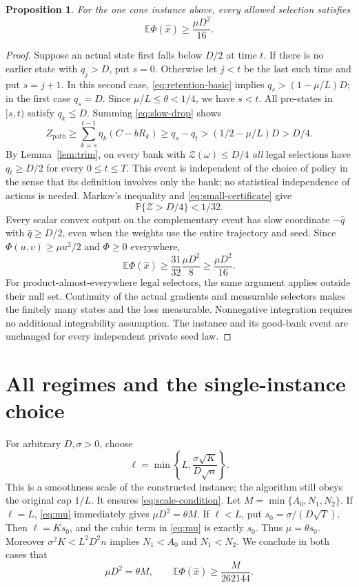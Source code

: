 \documentclass[11pt]{article}
\newtheorem{proposition}[theorem]{Proposition}
\theoremstyle{remark}
\newcommand{\E}{\mathbb E}
\newcommand{\Prob}{\mathbb P}
\begin{document}
\begin{proposition}\label{prop:cone-risk}
For the one cone instance above, every allowed selection satisfies
\begin{equation}\label{eq:cone-risk}
 \E\Phi(\widehat x)\ge\frac{\mu D^2}{16}.
\end{equation}
\end{proposition}
\begin{proof}
Suppose an actual state first falls below $D/2$ at time $t$. If there
is no earlier state with $q_j>D$, put $s=0$. Otherwise let $j<t$ be
the last such time and put $s=j+1$. In this second case,
\eqref{eq:retention-basic} implies
$q_s>(1-\mu/L)D$; in the first case $q_s=D$. Since
$\mu/L\le\theta<1/4$, we have $s<t$. All pre-states in $[s,t)$
satisfy $q_k\le D$. Summing \eqref{eq:slow-drop} shows
\[
 Z_{\mathrm{path}}\ge\sum_{k=s}^{t-1}\eta_k(C-bR_k)
          \ge q_s-q_t>(1/2-\mu/L)D>D/4.
\]
By Lemma~\ref{lem:trim}, on every bank with
$\mathcal Z(\omega)\le D/4$ \emph{all} legal selections have
$q_t\ge D/2$ for every $0\le t\le T$. This event is independent
of the choice of policy in the sense that its definition involves
only the bank; no statistical independence of actions is needed.
Markov's inequality and \eqref{eq:small-certificate} give
\[
 \Prob\{\mathcal Z>D/4\}<1/32.
\]
Every scalar convex output on the complementary event has slow
coordinate $-\widehat q$ with $\widehat q\ge D/2$, even when the
weights use the entire trajectory and seed. Since
$\Phi(u,v)\ge\mu u^2/2$ and $\Phi\ge0$ everywhere,
\[
 \E\Phi(\widehat x)\ge\frac{31}{32}\frac{\mu D^2}{8}
                         \ge\frac{\mu D^2}{16}.
\]
For product-almost-everywhere legal selectors, the same argument
applies outside their null set. Continuity of the actual gradients
and measurable selectors makes the finitely many states and the loss
measurable. Nonnegative integration requires no additional
integrability assumption. The instance and its good-bank event are
unchanged for every independent private seed law.
\end{proof}

\section{All regimes and the single-instance choice}

For arbitrary $D,\sigma>0$, choose
\begin{equation}\label{eq:ell}
 \ell=\min\!\left\{L,\frac{\sigma\sqrt K}{D\sqrt n}\right\}.
\end{equation}
This is a smoothness scale of the constructed instance; the algorithm
still obeys the original cap $1/L$. It ensures
\eqref{eq:scale-condition}. Let $M=\min\{A_0,N_1,N_2\}$.
If $\ell=L$, \eqref{eq:mu} immediately gives $\mu D^2=\theta M$.
If $\ell<L$, put $s_0=\sigma/(D\sqrt T)$. Then $\ell=Ks_0$,
and the cubic term in \eqref{eq:mu} is exactly $s_0$. Thus
$\mu=\theta s_0$. Moreover
$\sigma^2K<L^2D^2n$ implies $N_1<A_0$ and $N_1<N_2$.
We conclude in both cases that
\begin{equation}\label{eq:mu-rate}
 \mu D^2=\theta M,\qquad
 \E\Phi(\widehat x)\ge\frac{M}{262144}.
\end{equation}
\end{document}
